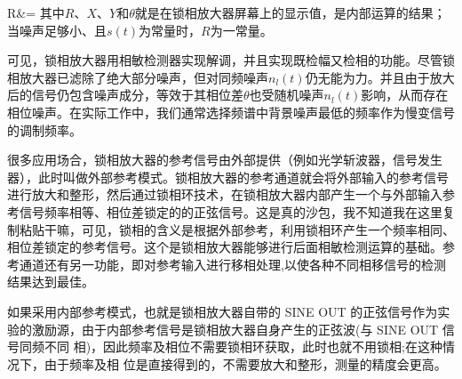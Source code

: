 \documentclass[11pt,a4paper]{ctexart}
\begin{document}
R&=
\eea
其中$R$、$X$、$Y$和$\theta$就是在锁相放大器屏幕上的显示值，是内部运算的结果；当噪声足够小、且$s(t)$为常量时，$R$为一常量。
\par
可见，锁相放大器用相敏检测器实现解调，并且实现既检幅又检相的功能。尽管锁相放大器已滤除了绝大部分噪声，但对同频噪声$n_l (t)$仍无能为力。并且由于放大后的信号仍包含噪声成分，等效于其相位差$\theta$也受随机噪声$n_l (t)$影响，从而存在相位噪声。在实际工作中，我们通常选择频谱中背景噪声最低的频率作为慢变信号的调制频率。\par
很多应用场合，锁相放大器的参考信号由外部提供（例如光学斩波器，信号发生器），此时叫做外部参考模式。锁相放大器的参考通道就会将外部输入的参考信号进行放大和整形，然后通过锁相环技术，在锁相放大器内部产生一个与外部输入参考信号频率相等、相位差锁定的的正弦信号。这是真的沙包，我不知道我在这里复制粘贴干嘛，可见，锁相的含义是根据外部参考，利用锁相环产生一个频率相同、相位差锁定的参考信号。这个是锁相放大器能够进行后面相敏检测运算的基础。参考通道还有另一功能，即对参考输入进行移相处理,以使各种不同相移信号的检测结果达到最佳。
\par
如果采用内部参考模式，也就是锁相放大器自带的 SINE OUT 的正弦信号作为实 验的激励源，由于内部参考信号是锁相放大器自身产生的正弦波(与 SINE OUT 信号同频不同 相)，因此频率及相位不需要锁相环获取，此时也就不用锁相;在这种情况下，由于频率及相 位是直接得到的，不需要放大和整形，测量的精度会更高。
\par
\end{document}

